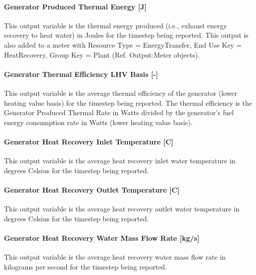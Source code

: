 \paragraph{Generator Produced Thermal Energy {[}J{]}}\label{generator-produced-thermal-energy-j-1}

This output variable is the thermal energy produced (i.e., exhaust energy recovery to heat water) in Joules for the timestep being reported. This output is also added to a meter with Resource Type = EnergyTransfer, End Use Key = HeatRecovery, Group Key = Plant (Ref. Output:Meter objects).

\paragraph{Generator Thermal Efficiency LHV Basis {[}-{]}}\label{generator-thermal-efficiency-lhv-basis--}

This output variable is the average thermal efficiency of the generator (lower heating value basis) for the timestep being reported. The thermal efficiency is the Generator Produced Thermal Rate in Watts divided by the generator's fuel energy consumption rate in Watts (lower heating value basis).

\paragraph{Generator Heat Recovery Inlet Temperature {[}C{]}}\label{generator-heat-recovery-inlet-temperature-c-1}

This output variable is the average heat recovery inlet water temperature in degrees Celsius for the timestep being reported.

\paragraph{Generator Heat Recovery Outlet Temperature {[}C{]}}\label{generator-heat-recovery-outlet-temperature-c-1}

This output variable is the average heat recovery outlet water temperature in degrees Celsius for the timestep being reported.

\paragraph{Generator Heat Recovery Water Mass Flow Rate {[}kg/s{]}}\label{generator-heat-recovery-water-mass-flow-rate-kgs}

This output variable is the average heat recovery water mass flow rate in kilograms per second for the timestep being reported.

